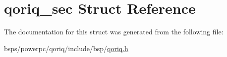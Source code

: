\hypertarget{structqoriq__sec}{}\section{qoriq\+\_\+sec Struct Reference}
\label{structqoriq__sec}


The documentation for this struct was generated from the following file\+:\begin{DoxyCompactItemize}
\item 
bsps/powerpc/qoriq/include/bsp/\mbox{\hyperlink{qoriq_8h}{qoriq.\+h}}\end{DoxyCompactItemize}
